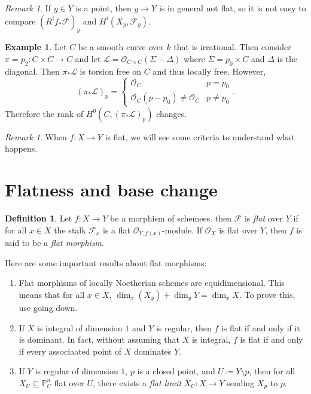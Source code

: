 \documentclass[leqno, openany]{memoir}
\theoremstyle{definition}
\newtheorem{defn}[thm]{Definition}
\newtheorem{exm}[thm]{Example}
\theoremstyle{remark}
\newtheorem{rmk}[thm]{Remark}
\theoremstyle{plain}
\theoremstyle{definition}
\theoremstyle{remark}
\renewcommand{\P}{\mathbb{P}}
\newcommand{\mc}[1]{\mathcal{#1}}
\newcommand{\ol}[1]{\overline{#1}}
\begin{document}
\begin{rmk} If $y \in Y$ is a point, then $y \to Y$ is in general not flat, so
it is not easy to compare ${(R^i f_* \mc{F})}_y$ and $H^i(X_y, \mc{F}_y)$.
\end{rmk}

\begin{exm} Let $C$ be a smooth curve over $k$ that is irrational. Then
    consider $\pi = p_2 \colon C \times C \to C$ and let $\mc{L} = \mc{O}_{C
    \times C}(\Sigma - \Delta)$ where $\Sigma = p_0 \times C$ and $\Delta$ is
    the diagonal. Then $\pi_* \mc{L}$ is torsion free on $C$ and thus locally
    free. However, \[ { ( \pi_* \mc{L} ) }_p = \begin{cases} \mc{O}_C & p = p_0
    \\ \mc{O}_C(p-p_0) \neq \mc{O}_C & p \neq p_0 \end{cases}. \] Therefore the
rank of $H^0(C, { ( \pi_* \mc{L} ) }_p)$ changes.  \end{exm}

\begin{rmk} When $f \colon X \to Y$ is flat, we will see some criteria to
understand what happens.  \end{rmk}

\section{Flatness and base change}%

\begin{defn} Let $f \colon X \to Y$ be a morphism of schemees. then $\mc{F}$ is
    \textit{flat} over $Y$ if for all $x \in X$ the stalk $\mc{F}_x$ is a flat
    $\mc{O}_{Y, f(x)}$-module. If $\mc{O}_X$ is flat over $Y$, then $f$ is said
    to be a \textit{flat morphism}.  \end{defn}

Here are some important results about flat morphisms: \begin{enumerate} \item
    Flat morphisms of locally Noetherian schemes are equidimensional. This
    means that for all $x \in X$, $\dim_x (X_y) + \dim_y Y = \dim_x X$. To
    prove this, use going down.  \item If $X$ is integral of dimension $1$ and
    $Y$ is regular, then $f$ is flat if and only if it is dominant. In fact,
    without assuming that $X$ is integral, $f$ is flat if and only if every
    associaated point of $X$ dominates $Y$.  \item If $Y$ is regular of
    dimension $1$, $p$ is a closed point, and $U \coloneqq Y \setminus p$, then
    for all $X_U \subseteq \P^n_U$ flat over $U$, there exists a \textit{flat
    limit} $\ol{X}_U \colon X \to Y$ sending $X_p$ to $p$.  \end{enumerate}
\end{document}
